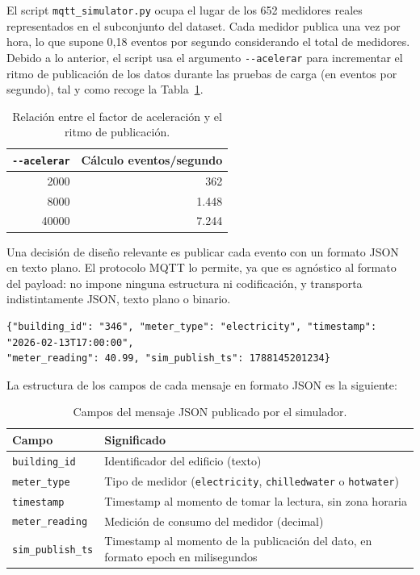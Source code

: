 El script \texttt{mqtt\_simulator.py} ocupa el lugar de los 652 medidores reales representados en el subconjunto del dataset. Cada medidor publica una vez por hora, lo que supone 0,18 eventos por segundo considerando el total de medidores. Debido a lo anterior, el script usa el argumento \texttt{-{}-acelerar} para incrementar el ritmo de publicación de los datos durante las pruebas de carga (en eventos por segundo), tal y como recoge la Tabla~\ref{tab:acelerar-simulador}.

\begin{table}[H]
  \centering
  \begin{tabular}{|r|r|}
    \hline
    \textbf{\texttt{-{}-acelerar}} & \textbf{Cálculo eventos/segundo} \\ \hline
    2000 & 362 \\ \hline
    8000 & 1.448 \\ \hline
    40000 & 7.244 \\ \hline
  \end{tabular}
  \caption{Relación entre el factor de aceleración y el ritmo de publicación.}
  \label{tab:acelerar-simulador}
\end{table}

Una decisión de diseño relevante es publicar cada evento con un formato JSON en texto plano. El protocolo MQTT lo permite, ya que es agnóstico al formato del payload: no impone ninguna estructura ni codificación, y transporta indistintamente JSON, texto plano o binario.

{\footnotesize
\begin{verbatim}
{"building_id": "346", "meter_type": "electricity", "timestamp": "2026-02-13T17:00:00",
"meter_reading": 40.99, "sim_publish_ts": 1788145201234}
\end{verbatim}
}

La estructura de los campos de cada mensaje en formato JSON es la siguiente:

\begin{table}[H]
  \centering
  \begin{tabular}{|l|p{9cm}|}
    \hline
    \textbf{Campo} & \textbf{Significado} \\ \hline
    \texttt{building\_id} & Identificador del edificio (texto) \\ \hline
    \texttt{meter\_type} & Tipo de medidor (\texttt{electricity}, \texttt{chilledwater} o \texttt{hotwater}) \\ \hline
    \texttt{timestamp} & Timestamp al momento de tomar la lectura, sin zona horaria \\ \hline
    \texttt{meter\_reading} & Medición de consumo del medidor (decimal) \\ \hline
    \texttt{sim\_publish\_ts} & Timestamp al momento de la publicación del dato, en formato epoch en milisegundos \\ \hline
  \end{tabular}
  \caption{Campos del mensaje JSON publicado por el simulador.}
  \label{tab:payload-simulador}
\end{table}

